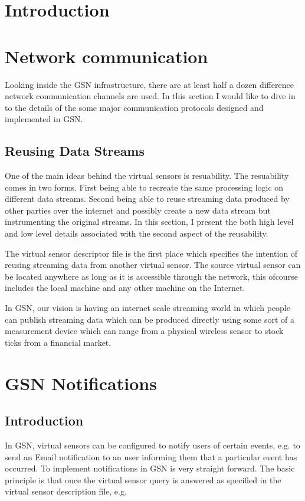 \section{Introduction}
\section{Network communication}
Looking inside the GSN infrastructure, there are at least half a dozen difference network communication channels are used. In this section I would like to dive in to the details
of the some major communication protocols designed and implemented in GSN. 

\subsection{Reusing Data Streams}

One of the main ideas behind the virtual sensors is resuability. The resuability comes in two forms.
First being able to recreate the same processing logic on different data streams.
Second being able to reuse streaming data produced by other parties over the internet and possibly create a new data stream but instrumenting the original streams.
In this section, I present the both high level and low level details associated with the second aspect of the reusability.

The virtual sensor descriptor file is the first place which specifies the intention of reusing streaming data from another virtual sensor. The source virtual sensor can be located
anywhere as long as it is accessible through the network, this ofcourse includes the local machine and any other machine on the Internet. 


In GSN, our vision is having an internet scale streaming world in which people can publish streaming data which
can be produced directly using some sort of a measurement device which can range from a physical wireless sensor to stock ticks from a financial market.

\section{GSN Notifications}

\subsection{Introduction}

In GSN, virtual sensors can be configured to notify users of certain events, e.g. to send an Email notification to an user informing them that a particular event has occurred. To implement notifications in GSN is very straight forward. The basic principle is that once the virtual sensor query is answered as specified in the virtual sensor description file, e.g.


